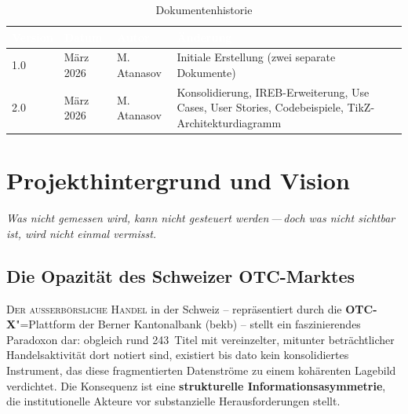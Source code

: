 \documentclass[11pt, a4paper, oneside, openany]{report}
\newcommand{\term}[1]{\textcolor{SwissRed}{\textsf{\textbf{#1}}}}
\begin{document}
\vspace{1cm}
\begin{table}[H]
\centering
\caption{Dokumentenhistorie}
\sffamily\small
{}
\begin{tabularx}{\textwidth}{l l l X}
  \toprule
  \rowcolor{DeepNavy} \textcolor{white}{\textbf{Version}} & \textcolor{white}{\textbf{Datum}} & \textcolor{white}{\textbf{Autor}} & \textcolor{white}{\textbf{Änderung}} \\
  \midrule
  1.0 & März 2026 & M.\,Atanasov & Initiale Erstellung (zwei separate Dokumente) \\
  2.0 & März 2026 & M.\,Atanasov & Konsolidierung, IREB-Erweiterung, Use Cases, User Stories, Codebeispiele, TikZ-Architekturdiagramm \\
  \bottomrule
\end{tabularx}
\end{table}

\tableofcontents
\clearpage
\listoftables
\clearpage
\listoffigures
\clearpage

\setcounter{page}{1}

\chapter{Projekthintergrund und Vision}
\label{ch:hintergrund}

\epigraph{\itshape Was nicht gemessen wird, kann nicht gesteuert werden\,---\,doch was nicht sichtbar ist, wird nicht einmal vermisst.}{}

\section{Die Opazität des Schweizer OTC-Marktes}

\lettrine[lines=3, lraise=0.1, findent=3pt, nindent=0pt]{\textcolor{SwissRed}{D}}{er ausserbörsliche Handel} in der Schweiz -- repräsentiert durch die \term{OTC-X}"=Plattform der Berner Kantonalbank (\gls{bekb}) -- stellt ein faszinierendes Paradoxon dar: obgleich rund 243~Titel mit vereinzelter, mitunter beträchtlicher Handelsaktivität dort notiert sind, existiert bis dato kein konsolidiertes Instrument, das diese fragmentierten Datenströme zu einem kohärenten Lagebild verdichtet. Die Konsequenz ist eine \textbf{strukturelle Informationsasymmetrie}, die institutionelle Akteure vor substanzielle Herausforderungen stellt.
\end{document}
